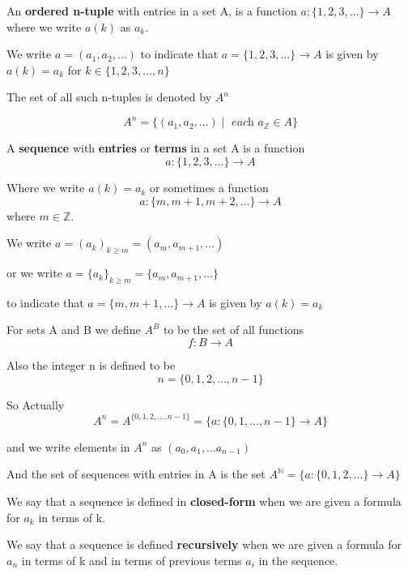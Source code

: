 
\begin{defn}

An \textbf{ordered n-tuple} with entries in a set A, is a function $a\colon \{1,2,3,\dots\}\to A$ where we write $a(k)$ as $a_k$.

We write $a=(a_1,a_2,\dots)$ to indicate that $a=\{1,2,3,\dots\}\to A$ is given by $a(k)=a_k$ for $k\in\{1,2,3,\dots , n\}$

The set of all such n-tuples is denoted by $A^n$

\[A^n = \{(a_1,a_2,\dots )\mid \textit{ each } a_{\mathbb{Z}}\in A\}\]

\end{defn}

\begin{defn}

A \textbf{sequence} with \textbf{entries} or \textbf{terms} in a set A is a function \[a\colon \{1,2,3,\dots\}\to A\]

Where we write $a(k)= a_k$ or sometimes a function \[a\colon \{m,m+1,m+2,\dots\}\to A\] where $m\in \mathbb{Z}$.

We write $a = (a_k)_{k\geq m} = (a_m,a_{m+1},\dots)$

or we write $a = \{a_k\}_{k\geq m} = \{a_m,a_{m+1},\dots\}$

to indicate that $a = \{m,m+1,\dots\}\to A$ is given by $a(k) = a_k$

\end{defn}

\begin{rem}
For sets A and B we define $A^B$ to be the set of all functions \[f\colon B\to A\]

Also the integer n is defined to be \[n = \{0,1,2,\dots,n-1\}\]

So Actually \[A^n = A^{\{0,1,2,\dots,n-1\}} = \{a\colon \{0,1,\dots ,n-1\}\to A\}\]

and we write elements in $A^n$ as $(a_0,a_1,\dots a_{n-1})$

And the set of sequences with entries in A is the set $A^{\mathbb{N}}=\{a\colon \{0,1,2,\dots \}\to A\}$
\end{rem} 

\begin{defn}
We say that a sequence is defined in \textbf{closed-form} when we are given a formula for $a_k$ in terms of k.

We say that a sequence is defined \textbf{recursively} when we are given a formula for $a_n$ in terms of k and in terms of previous terms $a_i$ in the sequence.
\end{defn}

